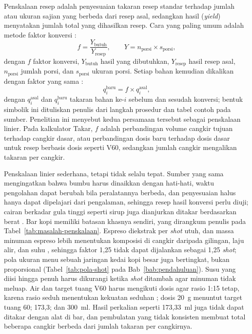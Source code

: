 Penskalaan resep adalah penyesuaian takaran resep standar terhadap jumlah atau ukuran sajian yang berbeda dari resep asal, sedangkan hasil (\textit{yield}) menyatakan jumlah total yang dihasilkan resep. Cara yang paling umum adalah metode faktor konversi \citep*{bccook2015basic}:
\begin{equation}
f = \frac{Y_{\mathrm{butuh}}}{Y_{\mathrm{resep}}}, \qquad Y = n_{\mathrm{porsi}} \times s_{\mathrm{porsi}},
\label{eq:faktor-konversi}
\end{equation}
dengan $f$ faktor konversi, $Y_{\mathrm{butuh}}$ hasil yang dibutuhkan, $Y_{\mathrm{resep}}$ hasil resep asal, $n_{\mathrm{porsi}}$ jumlah porsi, dan $s_{\mathrm{porsi}}$ ukuran porsi. Setiap bahan kemudian dikalikan dengan faktor yang sama \citep*{bccook2015basic}:
\begin{equation}
q_i^{\mathrm{baru}} = f \times q_i^{\mathrm{asal}},
\label{eq:skala-linier}
\end{equation}
dengan $q_i^{\mathrm{asal}}$ dan $q_i^{\mathrm{baru}}$ takaran bahan ke-$i$ sebelum dan sesudah konversi; bentuk simbolik ini dituliskan penulis dari langkah prosedur dan tabel contoh pada sumber. Penelitian ini menyebut kedua persamaan tersebut sebagai penskalaan linier. Pada kalkulator Takar, $f$ adalah perbandingan volume cangkir tujuan terhadap cangkir dasar, atau perbandingan dosis baru terhadap dosis dasar untuk resep berbasis dosis seperti V60, sedangkan jumlah cangkir mengalikan takaran per cangkir.

Penskalaan linier sederhana, tetapi tidak selalu tepat. Sumber yang sama mengingatkan bahwa bumbu harus dinaikkan dengan hati-hati, waktu pengolahan dapat berubah bila peralatannya berbeda, dan penyesuaian halus hanya dapat dipelajari dari pengalaman, sehingga resep hasil konversi perlu diuji; cairan berkadar gula tinggi seperti sirup juga dianjurkan ditakar berdasarkan berat \citep*{bccook2015basic}. Bar kopi memiliki batasan khasnya sendiri, yang dirangkum penulis pada Tabel~\ref{tab:masalah-penskalaan}. Espreso diekstrak per \textit{shot} utuh, dan massa minuman espreso lebih menentukan komposisi di cangkir daripada gilingan, laju alir, dan suhu \citep*{schmieder2023influence}, sehingga faktor 1,25 tidak dapat dijalankan sebagai 1,25 \textit{shot}; pola ukuran menu sebuah jaringan kedai kopi besar juga bertingkat, bukan proporsional (Tabel~\ref{tab:pola-shot} pada Bab~\ref{bab:pendahuluan}). Susu yang diisi hingga penuh harus dikurangi ketika \textit{shot} ditambah agar minuman tidak meluap. Air dan target tuang V60 harus mengikuti dosis agar rasio 1:15 tetap, karena rasio seduh menentukan kekuatan seduhan \citep*{liang2021equilibrium}; dosis 20~g menuntut target tuang 60; 173,3; dan 300~ml. Hasil perkalian seperti 173,33~ml juga tidak dapat ditakar dengan alat di bar, dan pembulatan yang tidak konsisten membuat total beberapa cangkir berbeda dari jumlah takaran per cangkirnya.

